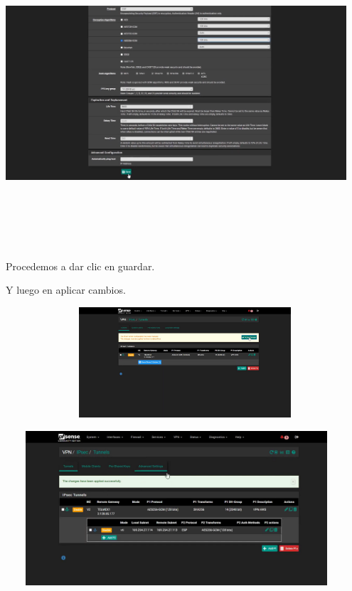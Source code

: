 \documentclass{article} %
\begin{document}
\noindent \includegraphics*[width=4.99in, height=4.49in, trim=1.96in 0.00in 1.70in 0.00in]{image36}

\noindent 

\noindent Procedemos a dar clic en guardar. 

\noindent 

\noindent 

\noindent Y luego en aplicar cambios.  

\noindent \includegraphics*[width=5.38in, height=1.62in, trim=1.32in 1.73in 0.98in 0.62in]{image37}

\noindent 

\noindent \includegraphics*[width=4.99in, height=2.26in, trim=0.63in 0.54in 0.51in 0.29in]{image38}
\end{document}
